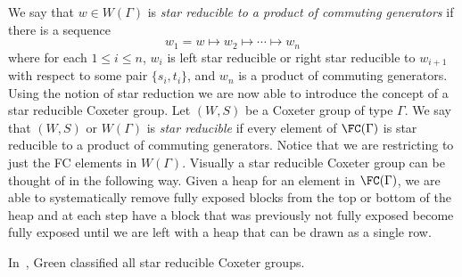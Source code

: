 We say that $w \in W(\Gamma)$ is \emph{star reducible to a product of commuting generators} if there is a sequence
\[w_1=w \mapsto w_2 \mapsto \cdots \mapsto w_n\]
where for each $1 \leq i \leq n$, $w_{i}$ is left star reducible or right star reducible to $w_{i+1}$ with respect to some pair $\{s_i, t_i\}$, and $w_n$ is a product of commuting generators. Using the notion of star reduction we are now able to introduce the concept of a star reducible Coxeter group. Let $(W,S)$ be a Coxeter group of type $\Gamma$. We say that $(W,S)$ or $W(\Gamma)$ is \emph{star reducible} if every element of $\FC(\Gamma)$ is star reducible to a product of commuting generators. Notice that we are restricting to just the FC elements in $W(\Gamma)$. Visually a star reducible Coxeter group can be thought of in the following way. Given a heap for an element in $\FC(\Gamma)$, we are able to systematically remove fully exposed blocks from the top or bottom of the heap and at each step have a block that was previously not fully exposed become fully exposed until we are left with a heap that can be drawn as a single row. 

In~\cite{Green2006a}, Green classified all star reducible Coxeter groups.


